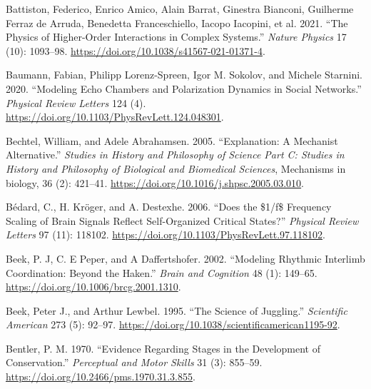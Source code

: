 \documentclass[
  a4paper,
  DIV=11,
  numbers=noendperiod,
  oneside]{scrreprt}
\newlength{\cslhangindent}
\newlength{\cslentryspacingunit} %
\newenvironment{CSLReferences}[2] %
 {%
  \setlength{\parindent}{0pt}
  \ifodd #1
  \let\oldpar\par
  \def\par{\hangindent=\cslhangindent\oldpar}
  \fi
  \setlength{\parskip}{#2\cslentryspacingunit}
 }%
 {}
\begin{document}
\begin{CSLReferences}{1}{0}
\leavevmode{}%
Battiston, Federico, Enrico Amico, Alain Barrat, Ginestra Bianconi,
Guilherme Ferraz de Arruda, Benedetta Franceschiello, Iacopo Iacopini,
et al. 2021. {``The Physics of Higher-Order Interactions in Complex
Systems.''} \emph{Nature Physics} 17 (10): 1093--98.
\url{https://doi.org/10.1038/s41567-021-01371-4}.

\leavevmode{}%
Baumann, Fabian, Philipp Lorenz-Spreen, Igor M. Sokolov, and Michele
Starnini. 2020. {``Modeling {Echo Chambers} and {Polarization Dynamics}
in {Social Networks}.''} \emph{Physical Review Letters} 124 (4).
\url{https://doi.org/10.1103/PhysRevLett.124.048301}.

\leavevmode{}%
Bechtel, William, and Adele Abrahamsen. 2005. {``Explanation: A
Mechanist Alternative.''} \emph{Studies in History and Philosophy of
Science Part C: Studies in History and Philosophy of Biological and
Biomedical Sciences}, Mechanisms in biology, 36 (2): 421--41.
\url{https://doi.org/10.1016/j.shpsc.2005.03.010}.

\leavevmode{}%
Bédard, C., H. Kröger, and A. Destexhe. 2006. {``Does the \$1/f\$
{Frequency Scaling} of {Brain Signals Reflect Self-Organized Critical
States}?''} \emph{Physical Review Letters} 97 (11): 118102.
\url{https://doi.org/10.1103/PhysRevLett.97.118102}.

\leavevmode{}%
Beek, P. J, C. E Peper, and A Daffertshofer. 2002. {``Modeling {Rhythmic
Interlimb Coordination}: {Beyond} the
{Haken}.''} \emph{Brain and
Cognition} 48 (1): 149--65.
\url{https://doi.org/10.1006/brcg.2001.1310}.

\leavevmode{}%
Beek, Peter J., and Arthur Lewbel. 1995. {``The {Science} of
{Juggling}.''} \emph{Scientific American} 273 (5): 92--97.
\url{https://doi.org/10.1038/scientificamerican1195-92}.

\leavevmode{}%
Bentler, P. M. 1970. {``Evidence Regarding {Stages} in the {Development}
of {Conservation}.''} \emph{Perceptual and Motor Skills} 31 (3):
855--59. \url{https://doi.org/10.2466/pms.1970.31.3.855}.


\end{CSLReferences}
\end{document}
